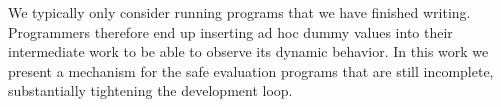 We typically only consider running programs that we have finished
writing. Programmers therefore end up inserting ad hoc dummy values into
their intermediate work to be able to observe its dynamic behavior. In this
work we present a mechanism for the safe evaluation programs that are still
incomplete, substantially tightening the development loop.
